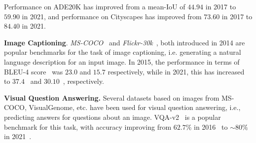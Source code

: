 \begin{description}
Performance on ADE20K has improved from a mean-IoU of $44.94$ in 2017 to $59.90$ in 2021, and performance on Cityscapes has improved from $73.60$ in 2017 to $84.40$ in 2021.
\item \textbf{Image Captioning}.
    \textit{MS-COCO}~\citep{lin2014microsoft} and \textit{Flickr-30k}~\citep{young-etal-2014-image}, both introduced in 2014 are popular benchmarks for the task of image captioning, i.e. generating a natural language description for an input image.
    In 2015, the performance in terms of BLEU-4 score~\citep{papineni2002bleu} was $23.0$ and $15.7$ respectively, while in 2021, this has increased to $37.4$~\citep{li2020oscar} and $30.10$~\citep{zhou2020unified}, respectively.
\item \textbf{Visual Question Answering.}
Several datasets based on images from MS-COCO, VisualGenome, etc. have been used for visual question answering, i.e., predicting answers for questions about an image.
VQA-v2~\citep{goyal2017making} is a popular benchmark for this task, with accuracy improving from $62.7\%$ in 2016~\citep{fukui2016multimodal} to ${\sim}80\%$ in 2021~\citep{zhang2021vinvl,li2020oscar}.
\end{description}


